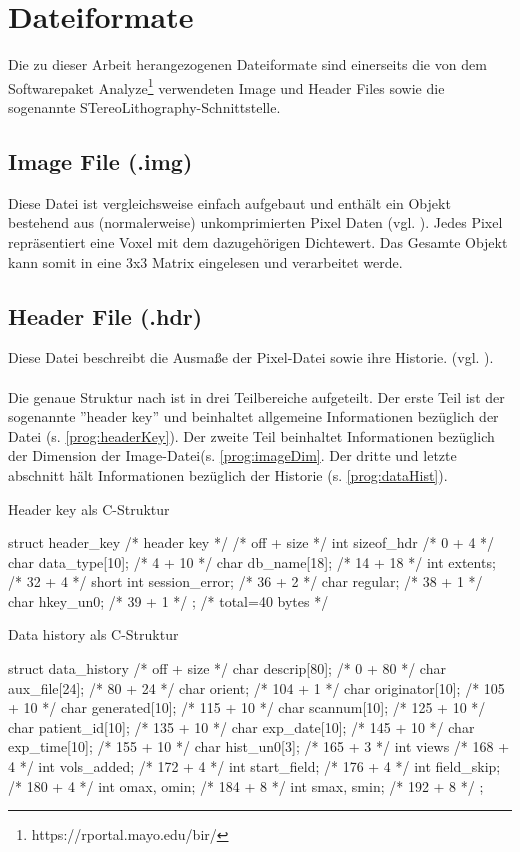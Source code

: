 \section{Dateiformate}
Die zu dieser Arbeit herangezogenen Dateiformate sind einerseits die von dem Softwarepaket Analyze\footnote{https://rportal.mayo.edu/bir/} verwendeten Image und Header Files sowie die sogenannte STereoLithography-Schnittstelle. 

\subsection{Image File (.img)}
Diese Datei ist vergleichsweise einfach aufgebaut und enthält ein Objekt bestehend aus (normalerweise) unkomprimierten Pixel Daten (vgl. \cite{AnalyzeFormat}). Jedes Pixel repräsentiert eine Voxel mit dem dazugehörigen Dichtewert. Das Gesamte Objekt kann somit in eine 3x3 Matrix eingelesen und verarbeitet werde.

\subsection{Header File (.hdr)}
Diese Datei beschreibt die Ausmaße der Pixel-Datei sowie ihre Historie. (vgl. \cite{AnalyzeFormat}). \\\\
Die genaue Struktur nach \cite{AnalyzeFormat} ist in drei Teilbereiche aufgeteilt. Der erste Teil ist der sogenannte ''header key'' und beinhaltet allgemeine Informationen bezüglich der Datei (s. \ref{prog:headerKey}). Der zweite Teil beinhaltet Informationen bezüglich der Dimension der Image-Datei(s. \ref{prog:imageDim}. Der dritte und letzte abschnitt hält Informationen bezüglich der Historie (s. \ref{prog:dataHist}).

\begin{program}
	\caption{Header key als C-Struktur \cite{AnalyzeFormat}}
	\label{prog:headerKey}
	\begin{CCode}
struct header_key /* header key */
{ /* off + size */
	int sizeof_hdr /* 0 + 4 */
	char data_type[10]; /* 4 + 10 */
	char db_name[18]; /* 14 + 18 */
	int extents; /* 32 + 4 */
	short int session_error; /* 36 + 2 */
	char regular; /* 38 + 1 */
	char hkey_un0; /* 39 + 1 */
}; /* total=40 bytes */ 
	\end{CCode}
\end{program}

\begin{program}
	\caption{Data history als C-Struktur \cite{AnalyzeFormat}}
	\label{prog:dataHist}
	\begin{CCode}
struct data_history
{ /* off + size */
	char descrip[80]; /* 0 + 80 */
	char aux_file[24]; /* 80 + 24 */
	char orient; /* 104 + 1 */
	char originator[10]; /* 105 + 10 */
	char generated[10]; /* 115 + 10 */
	char scannum[10]; /* 125 + 10 */
	char patient_id[10]; /* 135 + 10 */
	char exp_date[10]; /* 145 + 10 */
	char exp_time[10]; /* 155 + 10 */
	char hist_un0[3]; /* 165 + 3 */
	int views /* 168 + 4 */
	int vols_added; /* 172 + 4 */
	int start_field; /* 176 + 4 */
	int field_skip; /* 180 + 4 */
	int omax, omin; /* 184 + 8 */
	int smax, smin; /* 192 + 8 */
}; 
	\end{CCode}
\end{program}

